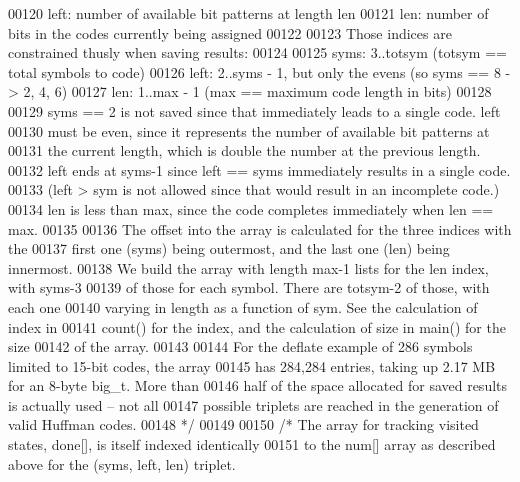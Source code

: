 \begin{DoxyCode}
00120 \textcolor{comment}{      left: number of available bit patterns at length len}
00121 \textcolor{comment}{      len: number of bits in the codes currently being assigned}
00122 \textcolor{comment}{}
00123 \textcolor{comment}{   Those indices are constrained thusly when saving results:}
00124 \textcolor{comment}{}
00125 \textcolor{comment}{      syms: 3..totsym (totsym == total symbols to code)}
00126 \textcolor{comment}{      left: 2..syms - 1, but only the evens (so syms == 8 -> 2, 4, 6)}
00127 \textcolor{comment}{      len: 1..max - 1 (max == maximum code length in bits)}
00128 \textcolor{comment}{}
00129 \textcolor{comment}{   syms == 2 is not saved since that immediately leads to a single code.  left}
00130 \textcolor{comment}{   must be even, since it represents the number of available bit patterns at}
00131 \textcolor{comment}{   the current length, which is double the number at the previous length.}
00132 \textcolor{comment}{   left ends at syms-1 since left == syms immediately results in a single code.}
00133 \textcolor{comment}{   (left > sym is not allowed since that would result in an incomplete code.)}
00134 \textcolor{comment}{   len is less than max, since the code completes immediately when len == max.}
00135 \textcolor{comment}{}
00136 \textcolor{comment}{   The offset into the array is calculated for the three indices with the}
00137 \textcolor{comment}{   first one (syms) being outermost, and the last one (len) being innermost.}
00138 \textcolor{comment}{   We build the array with length max-1 lists for the len index, with syms-3}
00139 \textcolor{comment}{   of those for each symbol.  There are totsym-2 of those, with each one}
00140 \textcolor{comment}{   varying in length as a function of sym.  See the calculation of index in}
00141 \textcolor{comment}{   count() for the index, and the calculation of size in main() for the size}
00142 \textcolor{comment}{   of the array.}
00143 \textcolor{comment}{}
00144 \textcolor{comment}{   For the deflate example of 286 symbols limited to 15-bit codes, the array}
00145 \textcolor{comment}{   has 284,284 entries, taking up 2.17 MB for an 8-byte big\_t.  More than}
00146 \textcolor{comment}{   half of the space allocated for saved results is actually used -- not all}
00147 \textcolor{comment}{   possible triplets are reached in the generation of valid Huffman codes.}
00148 \textcolor{comment}{ */}
00149 
00150 \textcolor{comment}{/* The array for tracking visited states, done[], is itself indexed identically}
00151 \textcolor{comment}{   to the num[] array as described above for the (syms, left, len) triplet.}

\end{DoxyCode}
